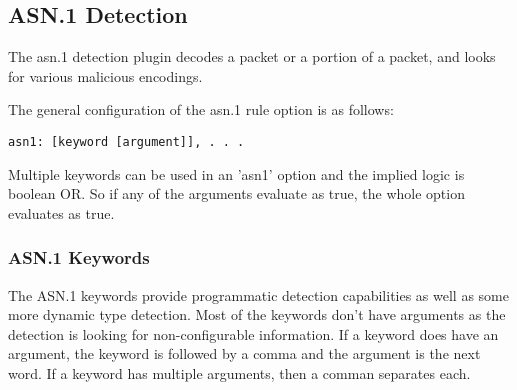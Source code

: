 \documentclass[english]{report}
\begin{document}
\subsection{ASN.1 Detection\label{asn1}}


The asn.1 detection plugin decodes a packet or a portion of a packet, and looks
for various malicious encodings.

The general configuration of the asn.1 rule option is as follows:

\begin{verbatim}
asn1: [keyword [argument]], . . . 
\end{verbatim}

Multiple keywords can be used in an 'asn1' option and the implied logic is
boolean OR.  So if any of the arguments evaluate as true, the whole option
evaluates as true.

\subsubsection{ASN.1 Keywords\label{asn1 keywords}}


The ASN.1 keywords provide programmatic detection capabilities as well as some
more dynamic type detection.  Most of the keywords don't have arguments as the
detection is looking for non-configurable information.  If a keyword does have
an argument, the keyword is followed by a comma and the argument is the next
word.  If a keyword has multiple arguments, then a comman separates each.
\end{document}
